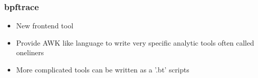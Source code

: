 \documentclass{beamer}
\begin{document}
\begin{frame}
  \begin{figure}
    \centering
		\noindent{}
  \end{figure}
\end{frame}



\begin{frame}
  \frametitle{bpftrace}
	\begin{Large}
  \begin{itemize}
    \item<+-> New frontend tool
    \item<+-> Provide AWK like language to write very specific analytic tools often called oneliners
    \item<+-> More complicated tools can be written as a '.bt' scripts
  \end{itemize}
\end{Large}
\end{frame}

\begin{frame}
  \begin{figure}
    \centering
		\noindent{}
  \end{figure}
\end{frame}
\end{document}
